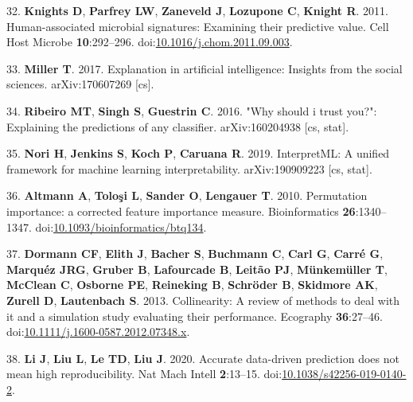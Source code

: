 \documentclass[
  11pt,
]{article}
\begin{document}
\leavevmode\hypertarget{ref-knights_human-associated_2011}{}%
32. \textbf{Knights D}, \textbf{Parfrey LW}, \textbf{Zaneveld J},
\textbf{Lozupone C}, \textbf{Knight R}. 2011. Human-associated microbial
signatures: Examining their predictive value. Cell Host Microbe
\textbf{10}:292--296.
doi:\href{https://doi.org/10.1016/j.chom.2011.09.003}{10.1016/j.chom.2011.09.003}.

\leavevmode\hypertarget{ref-miller_explanation_2017}{}%
33. \textbf{Miller T}. 2017. Explanation in artificial intelligence:
Insights from the social sciences. arXiv:170607269 {[}cs{]}.

\leavevmode\hypertarget{ref-ribeiro_why_2016}{}%
34. \textbf{Ribeiro MT}, \textbf{Singh S}, \textbf{Guestrin C}. 2016.
"Why should i trust you?": Explaining the predictions of any classifier.
arXiv:160204938 {[}cs, stat{]}.

\leavevmode\hypertarget{ref-nori_interpretml:_2019}{}%
35. \textbf{Nori H}, \textbf{Jenkins S}, \textbf{Koch P},
\textbf{Caruana R}. 2019. InterpretML: A unified framework for machine
learning interpretability. arXiv:190909223 {[}cs, stat{]}.

\leavevmode\hypertarget{ref-10.1093ux2fbioinformaticsux2fbtq134}{}%
36. \textbf{Altmann A}, \textbf{Toloşi L}, \textbf{Sander O},
\textbf{Lengauer T}. 2010. Permutation importance: a corrected feature
importance measure. Bioinformatics \textbf{26}:1340--1347.
doi:\href{https://doi.org/10.1093/bioinformatics/btq134}{10.1093/bioinformatics/btq134}.

\leavevmode\hypertarget{ref-dormann_collinearity:_2013}{}%
37. \textbf{Dormann CF}, \textbf{Elith J}, \textbf{Bacher S},
\textbf{Buchmann C}, \textbf{Carl G}, \textbf{Carré G}, \textbf{Marquéz
JRG}, \textbf{Gruber B}, \textbf{Lafourcade B}, \textbf{Leitão PJ},
\textbf{Münkemüller T}, \textbf{McClean C}, \textbf{Osborne PE},
\textbf{Reineking B}, \textbf{Schröder B}, \textbf{Skidmore AK},
\textbf{Zurell D}, \textbf{Lautenbach S}. 2013. Collinearity: A review
of methods to deal with it and a simulation study evaluating their
performance. Ecography \textbf{36}:27--46.
doi:\href{https://doi.org/10.1111/j.1600-0587.2012.07348.x}{10.1111/j.1600-0587.2012.07348.x}.

\leavevmode\hypertarget{ref-li_accurate_2020}{}%
38. \textbf{Li J}, \textbf{Liu L}, \textbf{Le TD}, \textbf{Liu J}. 2020.
Accurate data-driven prediction does not mean high reproducibility. Nat
Mach Intell \textbf{2}:13--15.
doi:\href{https://doi.org/10.1038/s42256-019-0140-2}{10.1038/s42256-019-0140-2}.
\end{document}
